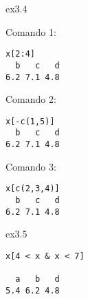 \vspace{0.5cm}

\begin{solution}{ex3.4}

\noindent Comando 1:
\begin{lstlisting}[style=Rstyle]
x[2:4]
  b   c   d
6.2 7.1 4.8
\end{lstlisting}
%
\noindent Comando 2:
\begin{lstlisting}[style=Rstyle]
x[-c(1,5)]
  b   c   d
6.2 7.1 4.8
\end{lstlisting}
%
\noindent Comando 3:
\begin{lstlisting}[style=Rstyle]
x[c(2,3,4)]
  b   c   d
6.2 7.1 4.8
\end{lstlisting}

\end{solution}

\vspace{0.5cm}

\begin{solution}{ex3.5}

\begin{lstlisting}[style=Rstyle]
x[4 < x & x < 7]

  a   b   d
5.4 6.2 4.8 
\end{lstlisting}

\end{solution}

\vspace{0.5cm}

